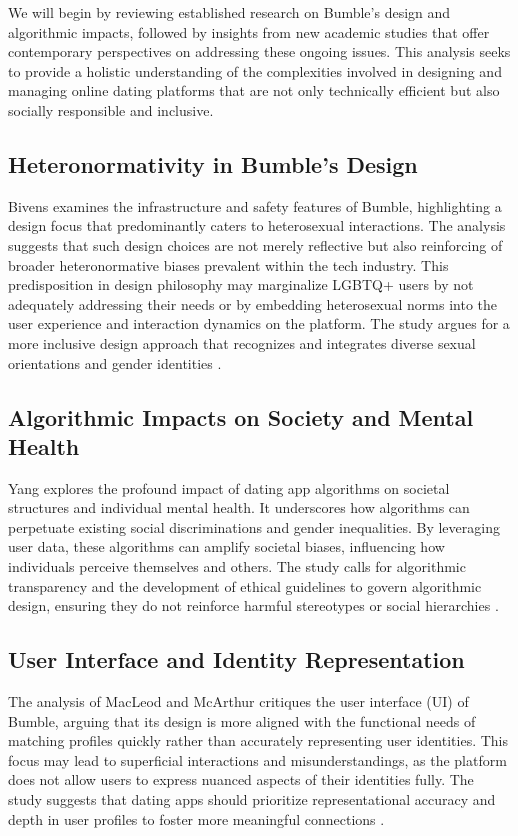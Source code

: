 We will begin by reviewing established research on Bumble's design and algorithmic impacts, followed by insights from new academic studies that offer contemporary perspectives on addressing these ongoing issues. This analysis seeks to provide a holistic understanding of the complexities involved in designing and managing online dating platforms that are not only technically efficient but also socially responsible and inclusive.

\subsection{Heteronormativity in Bumble's Design}
Bivens examines the infrastructure and safety features of Bumble, highlighting a design focus that predominantly caters to heterosexual interactions. The analysis suggests that such design choices are not merely reflective but also reinforcing of broader heteronormative biases prevalent within the tech industry. This predisposition in design philosophy may marginalize LGBTQ+ users by not adequately addressing their needs or by embedding heterosexual norms into the user experience and interaction dynamics on the platform. The study argues for a more inclusive design approach that recognizes and integrates diverse sexual orientations and gender identities \cite{Bivens_Hoque_2018}.

\subsection{Algorithmic Impacts on Society and Mental Health}
Yang explores the profound impact of dating app algorithms on societal structures and individual mental health. It underscores how algorithms can perpetuate existing social discriminations and gender inequalities. By leveraging user data, these algorithms can amplify societal biases, influencing how individuals perceive themselves and others. The study calls for algorithmic transparency and the development of ethical guidelines to govern algorithmic design, ensuring they do not reinforce harmful stereotypes or social hierarchies \cite{Yang_2021}.

\subsection{User Interface and Identity Representation}
The analysis of MacLeod and McArthur critiques the user interface (UI) of Bumble, arguing that its design is more aligned with the functional needs of matching profiles quickly rather than accurately representing user identities. This focus may lead to superficial interactions and misunderstandings, as the platform does not allow users to express nuanced aspects of their identities fully. The study suggests that dating apps should prioritize representational accuracy and depth in user profiles to foster more meaningful connections \cite{MacLeod_McArthur_2019}.

